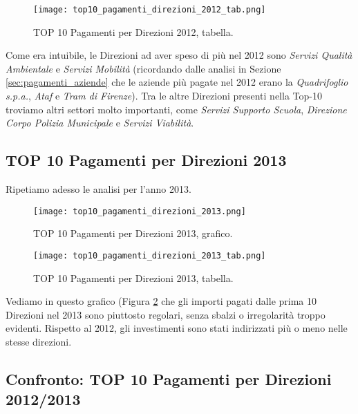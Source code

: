 			\begin{figure}[h!]
				\centering
					\texttt{[image: top10\_pagamenti\_direzioni\_2012\_tab.png]}
				\caption{TOP 10 Pagamenti per Direzioni 2012, tabella.}
				\label{fig:top10_pagamenti_direzioni_2012_tab}
			\end{figure}
			
			Come era intuibile, le Direzioni ad aver speso di più nel 2012 sono \textit{Servizi Qualità Ambientale} e \textit{Servizi Mobilità} (ricordando dalle analisi in Sezione \ref{sec:pagamenti_aziende} che le aziende più pagate nel 2012 erano la \textit{Quadrifoglio s.p.a.}, \textit{Ataf} e \textit{Tram di Firenze}). Tra le altre Direzioni presenti nella Top-10 troviamo altri settori molto importanti, come \textit{Servizi Supporto Scuola}, \textit{Direzione Corpo Polizia Municipale} e \textit{Servizi Viabilità}.
			
			\FloatBarrier
		
		\subsection{TOP 10 Pagamenti per Direzioni 2013} \label{subsec:top_pagamenti_direzioni_2013}
		
			Ripetiamo adesso le analisi per l'anno 2013.
			
			\begin{figure}[h!]
				\centering
					\texttt{[image: top10\_pagamenti\_direzioni\_2013.png]}
				\caption{TOP 10 Pagamenti per Direzioni 2013, grafico.}
				\label{fig:top10_pagamenti_direzioni_2013}
			\end{figure}
			
			\begin{figure}[h!]
				\centering
					\texttt{[image: top10\_pagamenti\_direzioni\_2013\_tab.png]}
				\caption{TOP 10 Pagamenti per Direzioni 2013, tabella.}
				\label{fig:top10_pagamenti_direzioni_2013_tab}
			\end{figure}
			
			Vediamo in questo grafico (Figura \ref{fig:top10_pagamenti_direzioni_2013} che gli importi pagati dalle prima 10 Direzioni nel 2013 sono piuttosto regolari, senza sbalzi o irregolarità troppo evidenti. Rispetto al 2012, gli investimenti sono stati indirizzati più o meno nelle stesse direzioni.
			
			\FloatBarrier
		
		\subsection{Confronto: TOP 10 Pagamenti per Direzioni 2012/2013} \label{subsec:pagamenti_direzioni_2012/2013}
	
